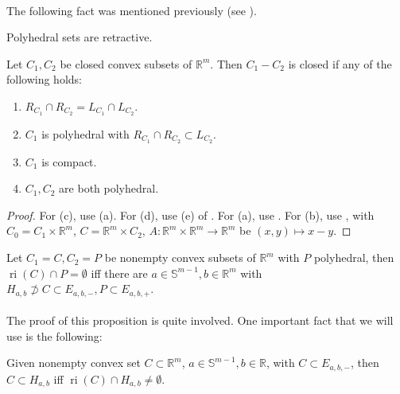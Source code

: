\paragraph{}The following fact was mentioned previously (see ).
\begin{lemm}\label{lemm:017-polyhedral-retractive}
	Polyhedral sets are retractive.
\end{lemm}

\begin{prop}\label{prop:017-closedness-vec-diff}
	Let $C_1,C_2$ be closed convex subsets of $\mathbb{R}^m$. Then $C_1-C_2$ is closed if any of the following holds:
	\begin{enumerate}[label=(\alph*)]
		\item $R_{C_1}\cap R_{C_2}=L_{C_1}\cap L_{C_2}$.
		\item $C_1$ is polyhedral with $R_{C_1}\cap R_{C_2}\subset L_{C_2}$.
		\item $C_1$ is compact.
		\item $C_1,C_2$ are both polyhedral.
	\end{enumerate}
\end{prop}

\begin{proof}
	For (c), use (a). For (d), use (e) of . For (a), use . For (b), use ,  with $C_0=C_1\times \mathbb{R}^{m}$, $C=\mathbb{R}^m\times C_2$, $A:\mathbb{R}^{m}\times \mathbb{R}^m\to \mathbb{R}^m$ be $(x,y)\mapsto x-y$.
\end{proof}

\begin{prop}\label{prop:017-polyhedral-proper-sep}
	Let $C_1=C,C_2=P$ be nonempty convex subsets of $\mathbb{R}^m$ with $P$ polyhedral, then $\operatorname{ri}(C)\cap P=\emptyset$ iff there are $a\in \mathbb{S}^{m-1},b\in \mathbb{R}^m$ with $H_{a,b}\nsupset C\subset E_{a,b,-},P\subset E_{a,b,+}$.
\end{prop}

\paragraph{}The proof of this proposition is quite involved. One important fact that we will use is the following:

\begin{lemm}\label{lemm:017-criterion-hyperplane-containment}
	Given nonempty convex set $C\subset \mathbb{R}^m$, $a\in \mathbb{S}^{m-1},b\in \mathbb{R}$, with $C\subset E_{a,b,-}$, then $C\subset H_{a,b}$ iff $\operatorname{ri}(C)\cap H_{a,b}\neq\emptyset$.
\end{lemm}

